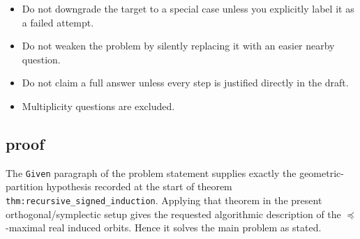 \documentclass[
]{article}
\providecommand{\tightlist}{%
  \setlength{\itemsep}{0pt}\setlength{\parskip}{0pt}}
\begin{document}
\begin{itemize}
\tightlist
\item
  Do not downgrade the target to a special case unless you explicitly
  label it as a failed attempt.
\item
  Do not weaken the problem by silently replacing it with an easier
  nearby question.
\item
  Do not claim a full answer unless every step is justified directly in
  the draft.
\item
  Multiplicity questions are excluded.
\end{itemize}

\subsection{proof}\label{proof-27}

The \texttt{Given} paragraph of the problem statement supplies exactly
the geometric-partition hypothesis recorded at the start of theorem
\texttt{thm:recursive\_signed\_induction}. Applying that theorem in the
present orthogonal/symplectic setup gives the requested algorithmic
description of the \(\preceq\)-maximal real induced orbits. Hence it
solves the main problem as stated.
\end{document}
